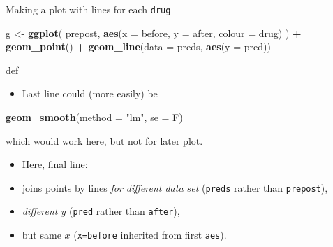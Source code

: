 \documentclass[ignorenonframetext,]{beamer}
\newenvironment{Shaded}{\begin{snugshade}}{\end{snugshade}}
\newcommand{\DataTypeTok}[1]{\textcolor[rgb]{0.13,0.29,0.53}{#1}}
\newcommand{\KeywordTok}[1]{\textcolor[rgb]{0.13,0.29,0.53}{\textbf{#1}}}
\newcommand{\NormalTok}[1]{#1}
\newcommand{\OperatorTok}[1]{\textcolor[rgb]{0.81,0.36,0.00}{\textbf{#1}}}
\newcommand{\StringTok}[1]{\textcolor[rgb]{0.31,0.60,0.02}{#1}}
\providecommand{\tightlist}{%
  \setlength{\itemsep}{0pt}\setlength{\parskip}{0pt}}
\begin{document}
\begin{frame}[fragile]{Making a plot with lines for each \texttt{drug}}
\protect\hypertarget{making-a-plot-with-lines-for-each-drug}{}

\begin{Shaded}
\begin{Highlighting}[]
\NormalTok{g <-}\StringTok{ }\KeywordTok{ggplot}\NormalTok{(}
\NormalTok{  prepost,}
  \KeywordTok{aes}\NormalTok{(}\DataTypeTok{x =}\NormalTok{ before, }\DataTypeTok{y =}\NormalTok{ after, }\DataTypeTok{colour =}\NormalTok{ drug)}
\NormalTok{) }\OperatorTok{+}
\StringTok{  }\KeywordTok{geom_point}\NormalTok{() }\OperatorTok{+}
\StringTok{  }\KeywordTok{geom_line}\NormalTok{(}\DataTypeTok{data =}\NormalTok{ preds, }\KeywordTok{aes}\NormalTok{(}\DataTypeTok{y =}\NormalTok{ pred))}
\end{Highlighting}
\end{Shaded}

def

\begin{itemize}
\tightlist
\item
  Last line could (more easily) be
\end{itemize}

\begin{Shaded}
\begin{Highlighting}[]
\KeywordTok{geom_smooth}\NormalTok{(}\DataTypeTok{method =} \StringTok{"lm"}\NormalTok{, }\DataTypeTok{se =}\NormalTok{ F)}
\end{Highlighting}
\end{Shaded}

which would work here, but not for later plot.

\begin{itemize}
\item
  Here, final line:
\item
  joins points by lines \emph{for different data
  set} (\texttt{preds} rather than \texttt{prepost}),
\item
  \emph{different \(y\)} (\texttt{pred} rather than \texttt{after}),
\item
  but same \(x\) (\texttt{x=before} inherited from first \texttt{aes}).
\end{itemize}

\end{frame}
\end{document}
